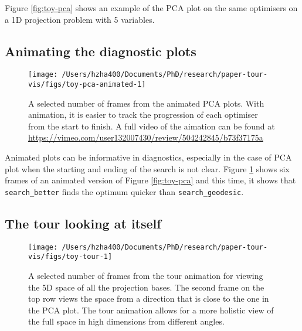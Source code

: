 Figure \ref{fig:toy-pca} shows an example of the PCA plot on the same
optimisers on a 1D projection problem with 5 variables.

\hypertarget{animating-the-diagnostic-plots}{%
\subsection{Animating the diagnostic
plots}\label{animating-the-diagnostic-plots}}

\begin{Schunk}
\begin{figure}

{\centering \texttt{[image: /Users/hzha400/Documents/PhD/research/paper-tour-vis/figs/toy-pca-animated-1]} 

}

\caption{A selected number of frames from the animated PCA plots. With animation, it is easier to track the progression of each optimiser from the start to finish. A full video of the aimation can be found at \url{https://vimeo.com/user132007430/review/504242845/b73f37175a}}\label{fig:toy-pca-animated}
\end{figure}
\end{Schunk}

Animated plots can be informative in diagnostics, especially in the case
of PCA plot when the starting and ending of the search is not clear.
Figure \ref{fig:toy-pca-animated} shows six frames of an animated
version of Figure \ref{fig:toy-pca} and this time, it shows that
\texttt{search\_better} finds the optimum quicker than
\texttt{search\_geodesic}.

\hypertarget{the-tour-looking-at-itself}{%
\subsection{The tour looking at
itself}\label{the-tour-looking-at-itself}}

\begin{Schunk}
\begin{figure}

{\centering \texttt{[image: /Users/hzha400/Documents/PhD/research/paper-tour-vis/figs/toy-tour-1]} 

}

\caption[A selected number of frames from the tour animation for viewing the 5D space of all the projection bases]{A selected number of frames from the tour animation for viewing the 5D space of all the projection bases. The second frame on the top row views the space from a direction that is close to the one in the PCA plot. The tour animation allows for a more holistic view of the full space in high dimensions from different angles.}\label{fig:toy-tour}
\end{figure}
\end{Schunk}

